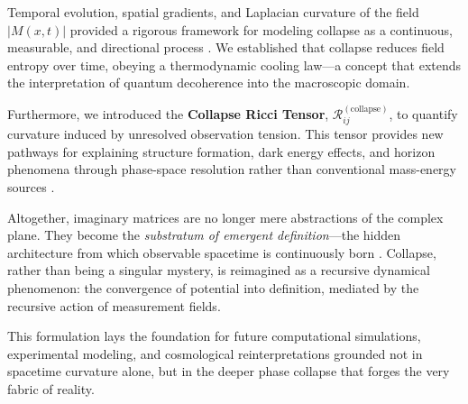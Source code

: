 Temporal evolution, spatial gradients, and Laplacian curvature of the field $|M(x,t)|$ provided a rigorous framework for modeling collapse as a continuous, measurable, and directional process \cite{decoherence_classical_emergence, planar_kinematics}. We established that collapse reduces field entropy over time, obeying a thermodynamic cooling law---a concept that extends the interpretation of quantum decoherence into the macroscopic domain.

Furthermore, we introduced the \textbf{Collapse Ricci Tensor}, $\mathcal{R}^{(\text{collapse})}_{ij}$, to quantify curvature induced by unresolved observation tension. This tensor provides new pathways for explaining structure formation, dark energy effects, and horizon phenomena through phase-space resolution rather than conventional mass-energy sources \cite{penrose_gravity_1996, diosi_penrose_model}.

Altogether, imaginary matrices are no longer mere abstractions of the complex plane. They become the \textit{substratum of emergent definition}---the hidden architecture from which observable spacetime is continuously born \cite{planar_kinematics_application, courant1941methods}. Collapse, rather than being a singular mystery, is reimagined as a recursive dynamical phenomenon: the convergence of potential into definition, mediated by the recursive action of measurement fields.

This formulation lays the foundation for future computational simulations, experimental modeling, and cosmological reinterpretations grounded not in spacetime curvature alone, but in the deeper phase collapse that forges the very fabric of reality.



\newpage
